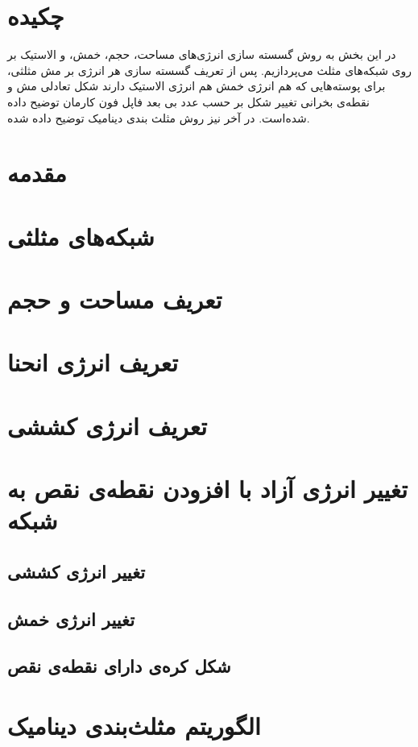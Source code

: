 \setRL
\clearpage
\def \MemDiscr {\Mempath /MembraneDiscrete}

\section{
چکیده
}
در این بخش به روش گسسته سازی انرژی‌های مساحت، حجم، خمش، و الاستیک بر روی شبکه‌های مثلث می‌پردازیم. پس از تعریف گسسته سازی هر انرژی بر مش مثلثی، برای پوسته‌هایی که هم انرژی خمش هم انرژی الاستیک دارند شکل تعادلی مش  و نقطه‌ی بخرانی تغییر شکل بر حسب عدد بی بعد فاپل فون کارمان توضیح داده شده‌است. در آخر نیز روش مثلث بندی دینامیک توضیح داده شده. 



\section{
مقدمه
}



\section{
شبکه‌های مثلثی
}



\section{
تعریف مساحت و حجم
\label{sec:areaVolumeDiscr}
}



\section{
تعریف انرژی انحنا
}



\section{
تعریف انرژی کششی
\label{sec:youngMesh}
}


\section{
تغییر انرژی آزاد با افزودن نقطەی نقص به شبکه
}
\subsection{
تغییر انرژی کششی
}

\subsection{
تغییر انرژی خمش
}

\subsection{
شکل کره‌ی دارای نقطه‌ی نقص
\label{sec:gammaTransition}
}


\section{
الگوریتم مثلث‌بندی دینامیک
}





